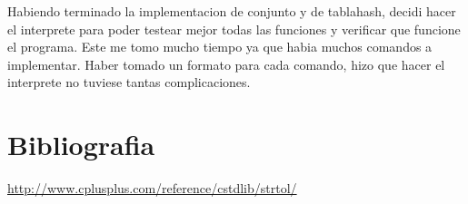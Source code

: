 \documentclass[]{article}
\begin{document}
Habiendo terminado la implementacion de conjunto y de tablahash, decidi hacer el interprete para poder testear mejor todas las funciones y verificar que funcione el programa. Este me tomo mucho tiempo ya que habia muchos comandos a implementar. Haber tomado un formato para cada comando, hizo que hacer el interprete no tuviese tantas complicaciones.
\section{Bibliografia}
\url{http://www.cplusplus.com/reference/cstdlib/strtol/}\\
\end{document}
